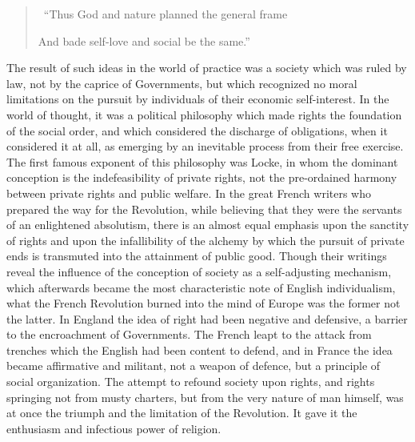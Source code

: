 \documentclass{book}
\begin{document}
\begin{quotation} \
	“Thus God and nature planned the general frame

	And bade self-love and social be the same.”
\end{quotation}

The result of such ideas in the world of practice was a society which was ruled by law, not by the caprice of Governments, but which recognized no moral limitations on the pursuit by individuals of their economic self-interest. In the world of thought, it was a political philosophy which made rights the foundation of the social order, and which considered the discharge of obligations, when it considered it at all, as emerging by an inevitable process from their free exercise. The first famous exponent of this philosophy was Locke, in whom the dominant conception is the indefeasibility of private rights, not the pre-ordained harmony between private rights and public welfare. In the great French writers who prepared the way for the Revolution, while believing that they were the servants of an enlightened absolutism, there is an almost equal emphasis upon the sanctity of rights and upon the infallibility of the alchemy by which the pursuit of private ends is transmuted into the attainment of public good. Though their writings reveal the influence of the conception of society as a self-adjusting mechanism, which afterwards became the most characteristic note of English individualism, what the French Revolution burned into the mind of Europe was the former not the latter. In England the idea of right had been negative and defensive, a barrier to the encroachment of Governments. The French leapt to the attack from trenches which the English had been content to defend, and in France the idea became affirmative and militant, not a weapon of defence, but a principle of social organization. The attempt to refound society upon rights, and rights springing not from musty charters, but from the very nature of man himself, was at once the triumph and the limitation of the Revolution. It gave it the enthusiasm and infectious power of religion.
\end{document}
